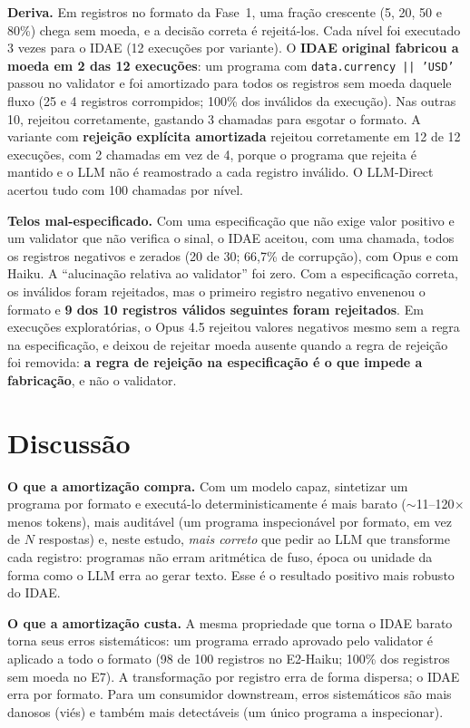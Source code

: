 \documentclass[sigconf,nonacm]{acmart}
\begin{document}
\textbf{Deriva.} Em registros no formato da Fase~1, uma fração crescente (5, 20, 50 e 80\%) chega sem moeda, e a decisão correta é rejeitá-los. Cada nível foi executado 3 vezes para o IDAE (12 execuções por variante). O \textbf{IDAE original fabricou a moeda em 2 das 12 execuções}: um programa com \texttt{data.currency || 'USD'} passou no validator e foi amortizado para todos os registros sem moeda daquele fluxo (25 e 4 registros corrompidos; 100\% dos inválidos da execução). Nas outras 10, rejeitou corretamente, gastando 3 chamadas para esgotar o formato. A variante com \textbf{rejeição explícita amortizada} rejeitou corretamente em 12 de 12 execuções, com 2 chamadas em vez de 4, porque o programa que rejeita é mantido e o LLM não é reamostrado a cada registro inválido. O LLM-Direct acertou tudo com 100 chamadas por nível.

\textbf{Telos mal-especificado.} Com uma especificação que não exige valor positivo e um validator que não verifica o sinal, o IDAE aceitou, com uma chamada, todos os registros negativos e zerados (20 de 30; 66,7\% de corrupção), com Opus e com Haiku. A ``alucinação relativa ao validator'' foi zero. Com a especificação correta, os inválidos foram rejeitados, mas o primeiro registro negativo envenenou o formato e \textbf{9 dos 10 registros válidos seguintes foram rejeitados}. Em execuções exploratórias, o Opus 4.5 rejeitou valores negativos mesmo sem a regra na especificação, e deixou de rejeitar moeda ausente quando a regra de rejeição foi removida: \textbf{a regra de rejeição na especificação é o que impede a fabricação}, e não o validator.

\section{Discussão}

\textbf{O que a amortização compra.} Com um modelo capaz, sintetizar um programa por formato e executá-lo deterministicamente é mais barato ($\sim$11--120$\times$ menos tokens), mais auditável (um programa inspecionável por formato, em vez de $N$ respostas) e, neste estudo, \textit{mais correto} que pedir ao LLM que transforme cada registro: programas não erram aritmética de fuso, época ou unidade da forma como o LLM erra ao gerar texto. Esse é o resultado positivo mais robusto do IDAE.

\textbf{O que a amortização custa.} A mesma propriedade que torna o IDAE barato torna seus erros sistemáticos: um programa errado aprovado pelo validator é aplicado a todo o formato (98 de 100 registros no E2-Haiku; 100\% dos registros sem moeda no E7). A transformação por registro erra de forma dispersa; o IDAE erra por formato. Para um consumidor downstream, erros sistemáticos são mais danosos (viés) e também mais detectáveis (um único programa a inspecionar).
\end{document}
